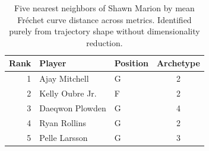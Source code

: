 \begin{table}[htbp]
  \centering\small
  \begin{tabular}{rllc}
    \toprule
    Rank & Player & Position & Archetype \\
    \midrule
    1 & Ajay Mitchell & G & 2 \\
    2 & Kelly Oubre Jr. & F & 2 \\
    3 & Daeqwon Plowden & G & 4 \\
    4 & Ryan Rollins & G & 2 \\
    5 & Pelle Larsson & G & 3 \\
    \bottomrule
  \end{tabular}
  \caption{Five nearest neighbors of Shawn Marion by mean Fr\'{e}chet curve distance across metrics. Identified purely from trajectory shape without dimensionality reduction.}
  \label{tab:Shawn_Marion_frechet_curve_neighbors}
\end{table}

